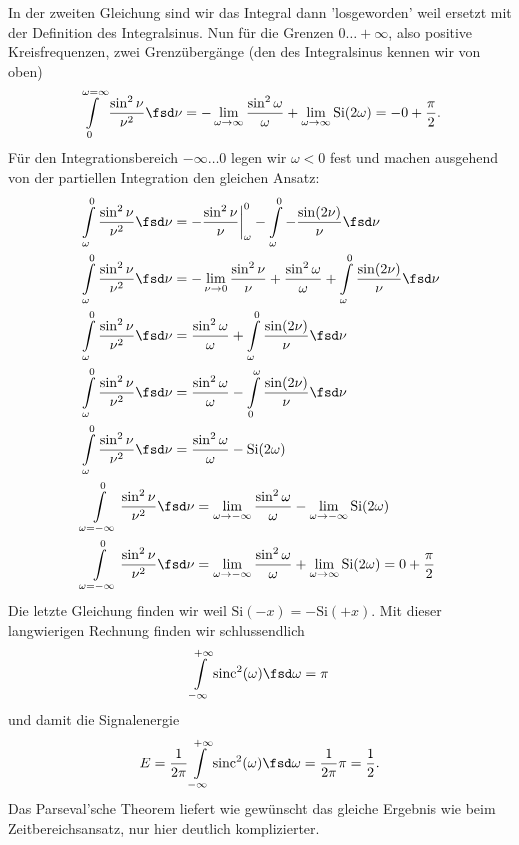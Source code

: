 \begin{ExCalc}
In der zweiten Gleichung sind wir das Integral dann 'losgeworden' weil ersetzt
mit der Definition des Integralsinus.
Nun für die Grenzen $0\dots +\infty$, also positive Kreisfrequenzen, zwei
Grenzübergänge (den des Integralsinus kennen wir von oben)
\begin{align}
\int\limits_0^{\omega=\infty} \frac{\sin^2 \nu}{\nu^2} \fsd \nu  =
- \lim_{\omega\to\infty}\frac{\sin^2 \omega}{\omega} + \lim_{\omega\to\infty}
\mathrm{Si}(2 \omega) = -0 + \frac{\pi}{2}.
\end{align}
%
Für den Integrationsbereich $-\infty\dots 0$ legen wir $\omega<0$ fest und machen
ausgehend von der partiellen Integration den gleichen Ansatz:
\begin{align}
&\int\limits_{\omega}^0 \frac{\sin^2 \nu}{\nu^2} \fsd \nu  =
-\frac{\sin^2 \nu}{\nu}\bigg|_{\omega}^0
- \int\limits_{\omega}^0 -\frac{\sin(2 \nu)}{\nu} \fsd \nu\\
&\int\limits_{\omega}^0 \frac{\sin^2 \nu}{\nu^2} \fsd \nu  =
-\lim_{\nu\to 0}\frac{\sin^2 \nu}{\nu}
+\frac{\sin^2 \omega}{\omega}
+ \int\limits_{\omega}^0 \frac{\sin(2 \nu)}{\nu} \fsd \nu\\
&\int\limits_{\omega}^0 \frac{\sin^2 \nu}{\nu^2} \fsd \nu  =
\frac{\sin^2 \omega}{\omega}
+ \int\limits_{\omega}^0 \frac{\sin(2 \nu)}{\nu} \fsd \nu\\
&\int\limits_{\omega}^0 \frac{\sin^2 \nu}{\nu^2} \fsd \nu  =
\frac{\sin^2 \omega}{\omega}
-\int\limits_{0}^\omega \frac{\sin(2 \nu)}{\nu} \fsd \nu\\
&\int\limits_{\omega}^0 \frac{\sin^2 \nu}{\nu^2} \fsd \nu  =
\frac{\sin^2 \omega}{\omega}
-\mathrm{Si}(2\omega)\\
&\int\limits_{\omega=-\infty}^0 \frac{\sin^2 \nu}{\nu^2} \fsd \nu  =
\lim_{\omega \to -\infty}\frac{\sin^2 \omega}{\omega}
-\lim_{\omega \to -\infty}\mathrm{Si}(2\omega)\\
&\int\limits_{\omega=-\infty}^0 \frac{\sin^2 \nu}{\nu^2} \fsd \nu  =
\lim_{\omega \to -\infty}\frac{\sin^2 \omega}{\omega}
+\lim_{\omega \to \infty}\mathrm{Si}(2\omega) = 0 + \frac{\pi}{2}
\end{align}
%
Die letzte Gleichung finden wir weil $\mathrm{Si}(-x)=-\mathrm{Si}(+x)$.
Mit dieser langwierigen Rechnung finden wir schlussendlich
\begin{align}
\int\limits_{-\infty}^{+\infty} \mathrm{sinc}^2(\omega) \fsd \omega = \pi
\end{align}
und damit die Signalenergie
\begin{align}
E = \frac{1}{2\pi}\int\limits_{-\infty}^{+\infty} \mathrm{sinc}^2(\omega) \fsd \omega
= \frac{1}{2\pi} \pi = \frac{1}{2}.
\end{align}
Das Parseval'sche Theorem liefert wie gewünscht das gleiche Ergebnis wie beim
Zeitbereichsansatz, nur hier deutlich komplizierter.


\end{ExCalc}

